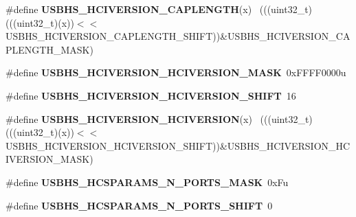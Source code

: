 \begin{DoxyCompactItemize}
\item 
\hypertarget{group___u_s_b_h_s___register___masks_ga47f33f77a4769878119d7435b49dd9e4}{}\#define {\bfseries U\+S\+B\+H\+S\+\_\+\+H\+C\+I\+V\+E\+R\+S\+I\+O\+N\+\_\+\+C\+A\+P\+L\+E\+N\+G\+T\+H}(x)                    ~(((uint32\+\_\+t)(((uint32\+\_\+t)(x))$<$$<$U\+S\+B\+H\+S\+\_\+\+H\+C\+I\+V\+E\+R\+S\+I\+O\+N\+\_\+\+C\+A\+P\+L\+E\+N\+G\+T\+H\+\_\+\+S\+H\+I\+F\+T))\&U\+S\+B\+H\+S\+\_\+\+H\+C\+I\+V\+E\+R\+S\+I\+O\+N\+\_\+\+C\+A\+P\+L\+E\+N\+G\+T\+H\+\_\+\+M\+A\+S\+K)\label{group___u_s_b_h_s___register___masks_ga47f33f77a4769878119d7435b49dd9e4}

\item 
\hypertarget{group___u_s_b_h_s___register___masks_gad546478629caa057f7475ab1a3e9dd93}{}\#define {\bfseries U\+S\+B\+H\+S\+\_\+\+H\+C\+I\+V\+E\+R\+S\+I\+O\+N\+\_\+\+H\+C\+I\+V\+E\+R\+S\+I\+O\+N\+\_\+\+M\+A\+S\+K}~0x\+F\+F\+F\+F0000u\label{group___u_s_b_h_s___register___masks_gad546478629caa057f7475ab1a3e9dd93}

\item 
\hypertarget{group___u_s_b_h_s___register___masks_gac2e7ba8b9272df7b0278ce46dadf3957}{}\#define {\bfseries U\+S\+B\+H\+S\+\_\+\+H\+C\+I\+V\+E\+R\+S\+I\+O\+N\+\_\+\+H\+C\+I\+V\+E\+R\+S\+I\+O\+N\+\_\+\+S\+H\+I\+F\+T}~16\label{group___u_s_b_h_s___register___masks_gac2e7ba8b9272df7b0278ce46dadf3957}

\item 
\hypertarget{group___u_s_b_h_s___register___masks_gaaa14d79ff6e69353f64707844ab52adb}{}\#define {\bfseries U\+S\+B\+H\+S\+\_\+\+H\+C\+I\+V\+E\+R\+S\+I\+O\+N\+\_\+\+H\+C\+I\+V\+E\+R\+S\+I\+O\+N}(x)                  ~(((uint32\+\_\+t)(((uint32\+\_\+t)(x))$<$$<$U\+S\+B\+H\+S\+\_\+\+H\+C\+I\+V\+E\+R\+S\+I\+O\+N\+\_\+\+H\+C\+I\+V\+E\+R\+S\+I\+O\+N\+\_\+\+S\+H\+I\+F\+T))\&U\+S\+B\+H\+S\+\_\+\+H\+C\+I\+V\+E\+R\+S\+I\+O\+N\+\_\+\+H\+C\+I\+V\+E\+R\+S\+I\+O\+N\+\_\+\+M\+A\+S\+K)\label{group___u_s_b_h_s___register___masks_gaaa14d79ff6e69353f64707844ab52adb}

\item 
\hypertarget{group___u_s_b_h_s___register___masks_gab9d379b91face45c4e71f08afb4292d7}{}\#define {\bfseries U\+S\+B\+H\+S\+\_\+\+H\+C\+S\+P\+A\+R\+A\+M\+S\+\_\+\+N\+\_\+\+P\+O\+R\+T\+S\+\_\+\+M\+A\+S\+K}~0x\+Fu\label{group___u_s_b_h_s___register___masks_gab9d379b91face45c4e71f08afb4292d7}

\item 
\hypertarget{group___u_s_b_h_s___register___masks_ga5e94f05faea8a21f815fd3833918f4dd}{}\#define {\bfseries U\+S\+B\+H\+S\+\_\+\+H\+C\+S\+P\+A\+R\+A\+M\+S\+\_\+\+N\+\_\+\+P\+O\+R\+T\+S\+\_\+\+S\+H\+I\+F\+T}~0\label{group___u_s_b_h_s___register___masks_ga5e94f05faea8a21f815fd3833918f4dd}


\end{DoxyCompactItemize}
